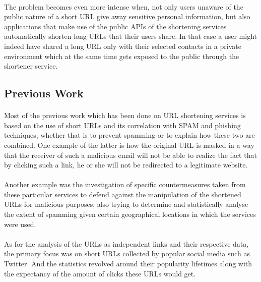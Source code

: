 \documentclass[12pt]{article}
\begin{document}
\paragraph{}
The problem becomes even more intense when, not only users unaware of the public nature of a short URL give away sensitive personal information, but also applications that make use of the public APIs of the shortening services automatically shorten long URLs that their users share. In that case a user might indeed have shared a long URL only with their selected contacts in a private environment which at the same time gets exposed to the public through the shortener service. 

\subsection{Previous Work}

\paragraph{}
Most of the previous work which has been done on URL shortening services is based on the use of short URLs and its correlation with SPAM and phishing techniques, whether that is to prevent spamming or to explain how these two are combined. One example of the latter is how the original URL is masked in a way that the receiver of such a malicious email will not be able to realize the fact that by clicking such a link, he or she will not be redirected to a legitimate website.
 
\paragraph{}
Another example was the investigation of specific countermeasures taken from these particular services to defend against the manipulation of the shortened URLs for malicious purposes; also trying to determine and statistically analyse the extent of spamming given certain geographical locations in which the services were used.

\paragraph{}
 As for the analysis of the URLs as independent links and their respective data, the primary focus was on short URLs collected by popular social media such as Twitter. And the statistics revolved around their popularity lifetimes along with the expectancy of the amount of clicks these URLs would get.
 
\end{document}
